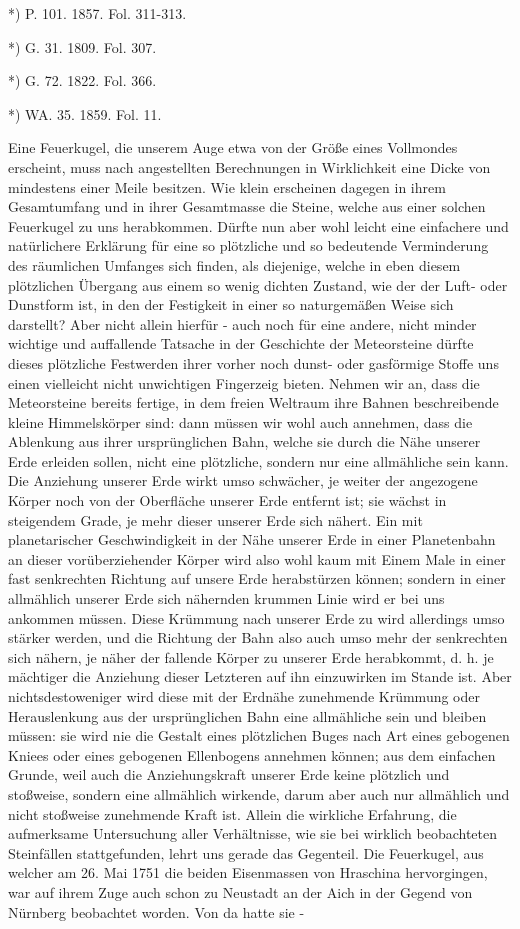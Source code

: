 \documentclass[a4paper, 11pt, oneside, polutonikogreek, german]{article}
\begin{document}
*) P. 101. 1857. Fol. 311-313.

*) G. 31. 1809. Fol. 307.

*) G. 72. 1822. Fol. 366.

*) WA. 35. 1859. Fol. 11.

Eine Feuerkugel, die unserem Auge etwa von der Größe eines Vollmondes erscheint, muss nach angestellten Berechnungen in Wirklichkeit eine Dicke von mindestens einer Meile besitzen. Wie klein erscheinen dagegen in ihrem Gesamtumfang und in ihrer Gesamtmasse die Steine, welche aus einer solchen Feuerkugel zu uns herabkommen. Dürfte nun aber wohl leicht eine einfachere und natürlichere Erklärung für eine so plötzliche und so bedeutende Verminderung des räumlichen Umfanges sich finden, als diejenige, welche in eben diesem plötzlichen Übergang aus einem so wenig dichten Zustand, wie der der Luft- oder Dunstform ist, in den der Festigkeit in einer so naturgemäßen Weise sich darstellt? Aber nicht allein hierfür - auch noch für eine andere, nicht minder wichtige und auffallende Tatsache in der Geschichte der Meteorsteine dürfte dieses plötzliche Festwerden ihrer vorher noch dunst- oder gasförmige Stoffe uns einen vielleicht nicht unwichtigen Fingerzeig bieten. Nehmen wir an, dass die Meteorsteine bereits fertige, in dem freien Weltraum ihre Bahnen beschreibende kleine Himmelskörper sind: dann müssen wir wohl auch annehmen, dass die Ablenkung aus ihrer ursprünglichen Bahn, welche sie durch die Nähe unserer Erde erleiden sollen, nicht eine plötzliche, sondern nur eine allmähliche sein kann. Die Anziehung unserer Erde wirkt umso schwächer, je weiter der angezogene Körper noch von der Oberfläche unserer Erde entfernt ist; sie wächst in steigendem Grade, je mehr dieser unserer Erde sich nähert. Ein mit planetarischer Geschwindigkeit in der Nähe unserer Erde in einer Planetenbahn an dieser vorüberziehender Körper wird also wohl kaum mit Einem Male in einer fast senkrechten Richtung auf unsere Erde herabstürzen können; sondern in einer allmählich unserer Erde sich nähernden krummen Linie wird er bei uns ankommen müssen. Diese Krümmung nach unserer Erde zu wird allerdings umso stärker werden, und die Richtung der Bahn also auch umso mehr der senkrechten sich nähern, je näher der fallende Körper zu unserer Erde herabkommt, d. h. je mächtiger die Anziehung dieser Letzteren auf ihn einzuwirken im Stande ist. Aber nichtsdestoweniger wird diese mit der Erdnähe zunehmende Krümmung oder Herauslenkung aus der ursprünglichen Bahn eine allmähliche sein und bleiben müssen: sie wird nie die Gestalt eines plötzlichen Buges nach Art eines gebogenen Kniees oder eines gebogenen Ellenbogens annehmen können; aus dem einfachen Grunde, weil auch die Anziehungskraft unserer Erde keine plötzlich und stoßweise, sondern eine allmählich wirkende, darum aber auch nur allmählich und nicht stoßweise zunehmende Kraft ist. Allein die wirkliche Erfahrung, die aufmerksame Untersuchung aller Verhältnisse, wie sie bei wirklich beobachteten Steinfällen stattgefunden, lehrt uns gerade das Gegenteil. Die Feuerkugel, aus welcher am 26. Mai 1751 die beiden Eisenmassen von Hraschina hervorgingen, war auf ihrem Zuge auch schon zu Neustadt an der Aich in der Gegend von Nürnberg beobachtet worden. Von da hatte sie - 
\end{document}
